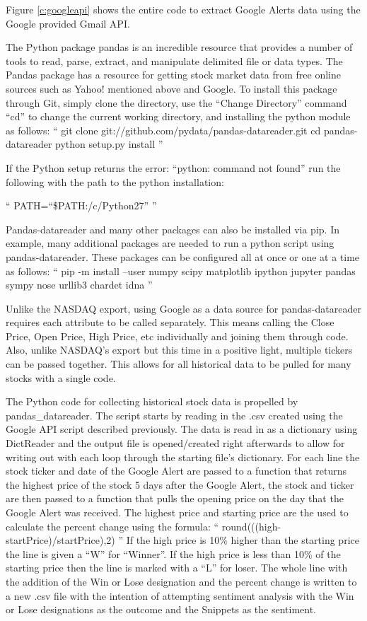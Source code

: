 \documentclass[sigconf]{acmart}
\begin{document}
Figure \ref{c:googleapi} shows the entire code to extract Google Alerts data using the Google provided Gmail API.


The Python package pandas is an incredible resource that provides a number of tools to read, parse, extract, and manipulate delimited file or data types. The Pandas package has a resource for getting stock market data from free online sources such as Yahoo! mentioned above and Google. To install this package through Git, simply clone the directory, use the ``Change Directory'' command ``cd'' to change the current working directory, and installing the python module as follows: 
``
git clone git://github.com/pydata/pandas-datareader.git
cd pandas-datareader
python setup.py install
''


If the Python setup returns the error: ``python: command not found'' run the following with the path to the python installation:

``
PATH=``\$PATH:/c/Python27''
''

Pandas-datareader and many other packages can also be installed via pip. In example, many additional packages are needed to run a python script using pandas-datareader. These packages can be configured all at once or one at a time as follows:
``
pip -m install --user numpy scipy matplotlib ipython jupyter pandas sympy nose urllib3 chardet idna
''


Unlike the NASDAQ export, using Google as a data source for pandas-datareader requires each attribute to be called separately. This means calling the Close Price, Open Price, High Price, etc individually and joining them through code. Also, unlike NASDAQ's export but this time in a positive light, multiple tickers can be passed together. This allows for all historical data to be pulled for many stocks with a single code. 

The Python code for collecting historical stock data is propelled by pandas\_datareader. The script starts by reading in the .csv created using the Google API script described previously. The data is read in as a dictionary using DictReader and the output file is opened/created right afterwards to allow for writing out with each loop through the starting file's dictionary. For each line the stock ticker and date of the Google Alert are passed to a function that returns the highest price of the stock 5 days after the Google Alert, the stock and ticker are then passed to a function that pulls the opening price on the day that the Google Alert was received. The highest price and starting price are the used to calculate the percent change using the formula: 
``
round(((high-startPrice)/startPrice),2)
''
If the high price is 10\% higher than the starting price the line is given a ``W'' for ``Winner''. If the high price is less than 10\% of the starting price then the line is marked with a ``L'' for loser. The whole line with the addition of the Win or Lose  designation and the percent change is written to a new .csv file with the intention of attempting sentiment analysis with the Win or Lose designations as the outcome and the Snippets as the sentiment. 
\end{document}
